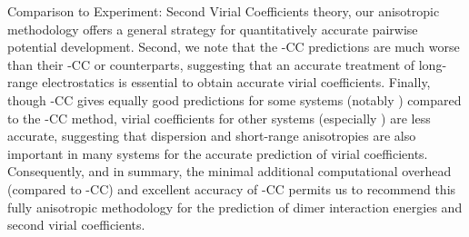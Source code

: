 \begin{subsection}{Comparison to Experiment: Second Virial Coefficients}
theory, our anisotropic methodology offers a general strategy for
quantitatively accurate
pairwise potential development. Second, we note that
the \isoff-CC 
predictions are much worse than their \mastiff-CC or \isaff counterparts, 
suggesting that
an accurate treatment of long-range electrostatics is essential to obtain
accurate virial coefficients.
Finally, though \isaff-CC gives equally good predictions for some systems
(notably \cl) compared to the \mastiff-CC method, 
virial coefficients for other systems (especially \ho) are less
accurate, suggesting that dispersion and short-range
anisotropies are also important in many systems for the accurate prediction of
virial coefficients. Consequently, and in summary, 
the minimal additional computational overhead (compared to \isaff-CC) and
excellent accuracy of \mastiff-CC permits us to recommend this fully anisotropic \mastiff methodology 
for the prediction of dimer interaction energies and second virial coefficients.


\clearpage
\end{subsection}
